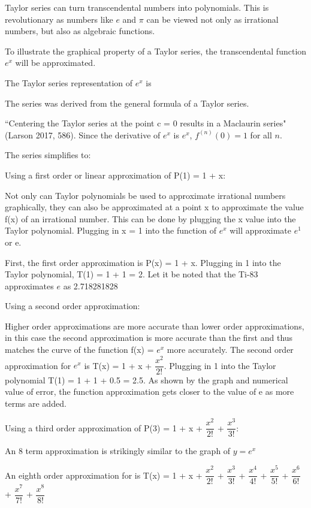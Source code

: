 Taylor series can turn transcendental numbers into polynomials. This is revolutionary as numbers like \(e\) and \(\pi\) can be viewed not only as irrational numbers, but also as algebraic functions.

To illustrate the graphical property of a Taylor series, the transcendental function \(e^{x}\) will be approximated.

The Taylor series representation of \(e^{x}\) is  

The series was derived from the general formula of a Taylor series.

``Centering the Taylor series at the point c = 0 results in a Maclaurin series" (Larson 2017, 586). Since the derivative of \(e^{x}\) is \(e^{x}\), \(f^{(n)}(0) = 1\) for all \(n\).

The series simplifies to:

Using a first order or linear approximation of P(1) = 1 + x:

Not only can Taylor polynomials be used to approximate irrational numbers graphically, they can also be approximated at a point x to approximate the value f(x) of an irrational number. This can be done by plugging the x value into the Taylor polynomial. Plugging in x = 1 into the function of \(e^x\) will  approximate \(e^1\) or e. 

First, the first order approximation is P(x) = 1 + x. Plugging in 1 into the Taylor polynomial, T(1) = 1 + 1 = 2. Let it be noted that the Ti-83 approximates \(e\) as 2.718281828

Using a second order approximation:


Higher order approximations are more accurate than lower order approximations, in this case the second approximation is more accurate than the first and thus matches the curve of the function f(x) = \(e^{x}\) more accurately. The second order approximation for \(e^{x}\) is T(x) = 1 + x + \(\dfrac{x^2}{2!}\). Plugging in 1 into the Taylor polynomial T(1) = 1 + 1 + 0.5 = 2.5. As shown by the graph and numerical value of error, the function approximation gets closer to the value of e as more terms are added.

Using a third order approximation of P(3) = 1 + x + \(\dfrac{x^{2}}{2!}\) + \(\dfrac{x^{3}}{3!}\):

An 8 term approximation is strikingly similar to the graph of \(y = e^{x}\)

An eighth order approximation for is T(x) = 1 + x + \(\dfrac{x^2}{2!}\) + \(\dfrac{x^3}{3!}\)
+ \(\dfrac{x^4}{4!}\) + \(\dfrac{x^5}{5!}\) + \(\dfrac{x^6}{6!}\) + \(\dfrac{x^7}{7!}\) + \(\dfrac{x^8}{8!}\)

